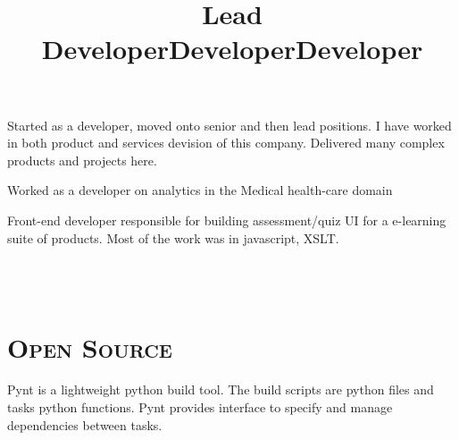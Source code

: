 \begin{resume}
\title{Lead Developer}
\begin{position}
Started as a developer, moved onto senior and then lead positions. I have worked in both product and services devision of this company. Delivered many complex products and projects here.
\end{position}

\title{Developer}
\begin{position}
Worked as a developer on analytics in the Medical health-care domain
\end{position}

\title{Developer}
\begin{position}
Front-end developer responsible  for building assessment/quiz UI for a e-learning suite of products. Most of the work was in javascript, XSLT. 
\end{position}






\begin{formatb}
  \\
  \body\\
\end{formatb}

\section{\textsc{Open Source}}

\begin{position}
Pynt is a lightweight python build tool. The build scripts are python files and tasks python functions. Pynt provides interface to specify and manage dependencies between tasks. 
\end{position}


\end{resume}
